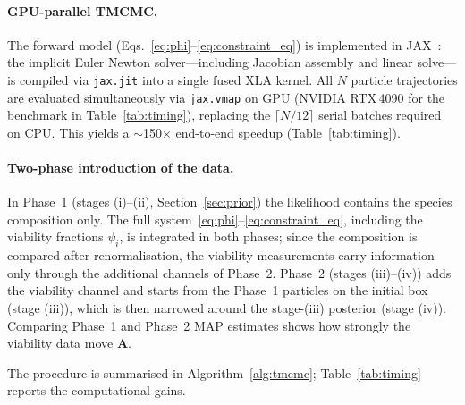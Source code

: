 \documentclass[pdflatex,sn-mathphys-ay,lineno]{sn-jnl}%
\begin{document}
\paragraph{GPU-parallel TMCMC.}
The forward model (Eqs.~\ref{eq:phi}--\ref{eq:constraint_eq}) is implemented in JAX~\citep{jax2018github}: the implicit Euler Newton solver---including Jacobian assembly and linear solve---is compiled via \texttt{jax.jit} into a single fused XLA kernel.
All $N$ particle trajectories are evaluated simultaneously via \texttt{jax.vmap} on GPU (NVIDIA RTX\,4090 for the benchmark in Table~\ref{tab:timing}), replacing the $\lceil N/12\rceil$ serial batches required on CPU.
This yields a $\sim$150$\times$ end-to-end speedup (Table~\ref{tab:timing}).

\paragraph{Two-phase introduction of the data.}
In Phase~1 (stages (i)--(ii), Section~\ref{sec:prior}) the likelihood contains the species composition only.
The full system~\eqref{eq:phi}--\eqref{eq:constraint_eq}, including the viability fractions $\psi_i$, is integrated in both phases; since the composition is compared after renormalisation, the viability measurements carry information only through the additional channels of Phase~2.
Phase~2 (stages (iii)--(iv)) adds the viability channel and starts from the Phase~1 particles on the initial box (stage (iii)), which is then narrowed around the stage-(iii) posterior (stage (iv)).
Comparing Phase~1 and Phase~2 MAP estimates shows how strongly the viability data move $\mathbf{A}$.

The procedure is summarised in Algorithm~\ref{alg:tmcmc}; Table~\ref{tab:timing} reports the computational gains.
\end{document}
